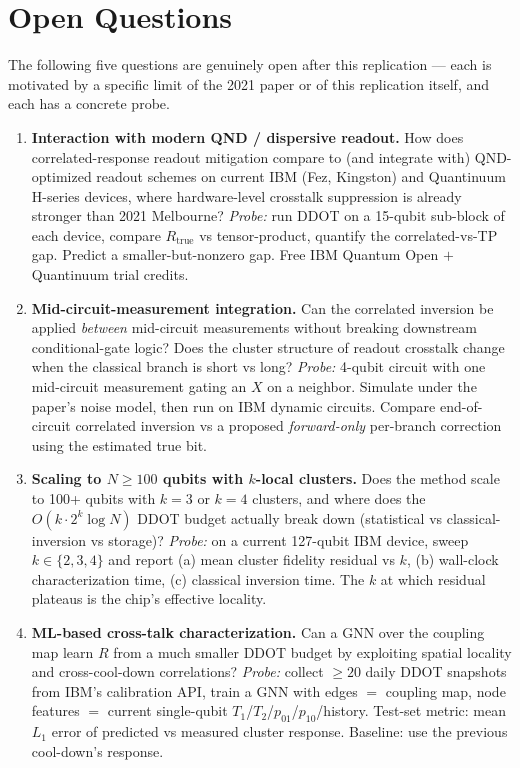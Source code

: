 \section{Open Questions}

The following five questions are genuinely open after this replication --- each is
motivated by a specific limit of the 2021 paper or of this replication itself, and
each has a concrete probe.

\begin{enumerate}

\item \textbf{Interaction with modern QND / dispersive readout.}
How does correlated-response readout mitigation compare to (and integrate with)
QND-optimized readout schemes on current IBM (Fez, Kingston) and Quantinuum
H-series devices, where hardware-level crosstalk suppression is already stronger
than 2021 Melbourne?
\emph{Probe:} run DDOT on a 15-qubit sub-block of each device, compare
$R_\text{true}$ vs tensor-product, quantify the correlated-vs-TP gap. Predict a
smaller-but-nonzero gap. Free IBM Quantum Open $+$ Quantinuum trial credits.

\item \textbf{Mid-circuit-measurement integration.}
Can the correlated inversion be applied \emph{between} mid-circuit measurements
without breaking downstream conditional-gate logic? Does the cluster structure
of readout crosstalk change when the classical branch is short vs long?
\emph{Probe:} 4-qubit circuit with one mid-circuit measurement gating an $X$ on
a neighbor. Simulate under the paper's noise model, then run on IBM dynamic
circuits. Compare end-of-circuit correlated inversion vs a proposed
\emph{forward-only} per-branch correction using the estimated true bit.

\item \textbf{Scaling to $N \geq 100$ qubits with $k$-local clusters.}
Does the method scale to 100+ qubits with $k=3$ or $k=4$ clusters, and where
does the $O(k\cdot 2^k \log N)$ DDOT budget actually break down (statistical
vs classical-inversion vs storage)?
\emph{Probe:} on a current 127-qubit IBM device, sweep $k\in\{2,3,4\}$ and
report (a) mean cluster fidelity residual vs $k$, (b) wall-clock
characterization time, (c) classical inversion time. The $k$ at which
residual plateaus is the chip's effective locality.

\item \textbf{ML-based cross-talk characterization.}
Can a GNN over the coupling map learn $R$ from a much smaller DDOT budget by
exploiting spatial locality and cross-cool-down correlations?
\emph{Probe:} collect $\geq 20$ daily DDOT snapshots from IBM's calibration
API, train a GNN with edges $=$ coupling map, node features $=$ current
single-qubit $T_1$/$T_2$/$p_{01}$/$p_{10}$/history. Test-set metric: mean
$L_1$ error of predicted vs measured cluster response. Baseline: use the
previous cool-down's response.


\end{enumerate}
